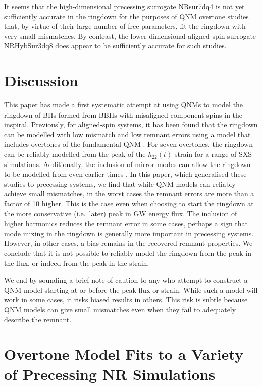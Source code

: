 It seems that the high-dimensional precessing surrogate NRsur7dq4 is not yet sufficiently accurate in the ringdown for the purposes of QNM overtone studies that, by virtue of their large number of free parameters, fit the ringdown with very small mismatches. 
By contrast, the lower-dimensional aligned-spin surrogate NRHybSur3dq8 does appear to be sufficiently accurate for such studies.


\section{Discussion} \label{sec:discussion}

This paper has made a first systematic attempt at using QNMs to model the ringdown of BHs formed from BBHs with misaligned component spins in the inspiral.
Previously, for aligned-spin systems, it has been found that the ringdown can be modelled with low mismatch and low remnant errors using a model that includes overtones of the fundamental QNM \cite{Giesler:2019uxc}. For seven overtones, the ringdown can be reliably modelled from the peak of the $h_{22}(t)$ strain for a range of SXS simulations.
Additionally, the inclusion of mirror modes can allow the ringdown to be modelled from even earlier times \cite{Dhani:2020nik}.
In this paper, which generalised these studies to precessing systems, we find that while QNM models can reliably achieve small mismatches, in the worst cases the remnant errors are more than a factor of 10 higher.
This is the case even when choosing to start the ringdown at the more conservative (i.e.\ later) peak in GW energy flux. 
The inclusion of higher harmonics reduces the remnant error in some cases, perhaps a sign that mode mixing in the ringdown is generally more important in precessing systems. However, in other cases, a bias remains in the recovered remnant properties.
We conclude that it is not possible to reliably model the ringdown from the peak in the flux, or indeed from the peak in the strain. 

We end by sounding a brief note of caution to any who attempt to construct a QNM model starting at or before the peak flux or strain. 
While such a model will work in some cases, it risks biased results in others. 
This risk is subtle because QNM models can give small mismatches even when they fail to adequately describe the remnant.


\section{Overtone Model Fits to a Variety of Precessing NR Simulations}\label{appendix_a}

